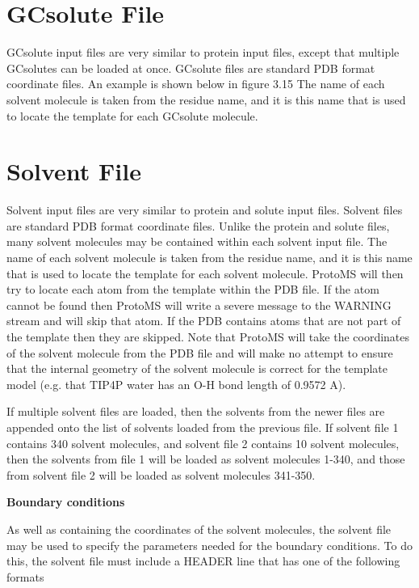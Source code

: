 \documentclass[letterpaper,10pt,english]{sphinxmanual}
\begin{document}
\section{GCsolute File}
\label{protoms:gcpdb}\label{protoms:gcsolute-file}
GCsolute input files are very similar to protein input files, except that multiple GCsolutes can be loaded at once. GCsolute files are standard PDB format coordinate files. An example is shown below in figure 3.15 The name of each solvent molecule is taken from the residue name, and it is this name that is used to locate the template for each GCsolute molecule.


\section{Solvent File}
\label{protoms:solvent-file}\label{protoms:solventpdb}
Solvent input files are very similar to protein and solute input files. Solvent files are standard PDB format coordinate files. Unlike the protein and solute files, many solvent molecules may be contained within each solvent input file. The name of each solvent molecule is taken from the residue name, and it is this name that is used to locate the template for each solvent molecule. ProtoMS will then try to locate each atom from the template within the PDB file. If the atom cannot be found then ProtoMS will write a severe message to the WARNING stream and will skip that atom. If the PDB contains atoms that are not part of the template then they are skipped. Note that ProtoMS will take the coordinates of the solvent molecule from the PDB file and will make no attempt to ensure that the internal geometry of the solvent molecule is correct for the template model (e.g. that
TIP4P water has an O-H bond length of 0.9572 A).

If multiple solvent files are loaded, then the solvents from the newer files are appended onto the list of solvents loaded from the previous file. If solvent file 1 contains 340 solvent molecules, and solvent file 2 contains 10 solvent molecules, then the solvents from file 1 will be loaded as solvent molecules 1-340, and those from solvent file 2 will be loaded as solvent molecules 341-350.

\textbf{Boundary conditions}

As well as containing the coordinates of the solvent molecules, the solvent file may be used to specify the parameters needed for the boundary conditions. To do this, the solvent file must include a HEADER line that has one of the following formats
\end{document}
